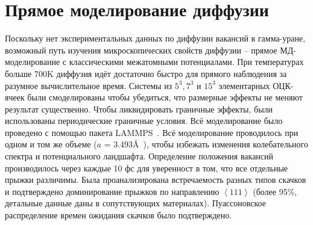 \documentclass[master,14pt,subf,href,colorlinks=true
]{disser}
\begin{document}
\section{Прямое моделирование диффузии}\label{chapter_direct_MD}
Поскольку нет экспериментальных данных по диффузии вакансий в гамма-уране, возможный путь изучения микроскопических свойств диффузии -- прямое МД-моделирование с классическими межатомными потенциалами. При температурах больше 700K диффузия идёт достаточно быстро для прямого наблюдения за разумное вычислительное время.
Системы из $5^3, 7^3$ и $15^3$ элементарных ОЦК-ячеек были смоделированы чтобы убедиться, что размерные эффекты не меняют результат существенно. Чтобы ликвидировать граничные эффекты, были использованы периодические граничные условия. Всё моделирование было проведено с помощью пакета LAMMPS~\cite{LAMMPS}.
Всё моделирование проводилось при одном и том же объеме ($a$ = 3.493\r{A}~\cite{U_SSS_2012}), чтобы избежать изменения колебательного спектра и потенциального ландшафта.
Определение положения вакансий производилось через каждые 10 фс для уверенност в том, что все отдельные прыжки различимы. Была проанализирована встречаемость разных типов скачков и подтверждено доминирование прыжков по направлению $\left\langle 111\right\rangle$ (более 95\%, детальные данные даны в сопутствующих материалах). Пуассоновское распределение времен ожидания скачков было подтверждено.
\end{document}
